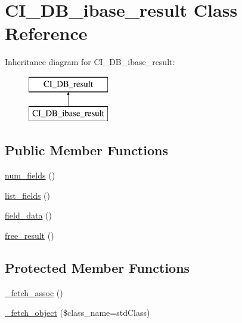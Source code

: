 \hypertarget{class_c_i___d_b__ibase__result}{}\section{C\+I\+\_\+\+D\+B\+\_\+ibase\+\_\+result Class Reference}
\label{class_c_i___d_b__ibase__result}
Inheritance diagram for C\+I\+\_\+\+D\+B\+\_\+ibase\+\_\+result\+:\begin{figure}[H]
\begin{center}
\leavevmode
\includegraphics[height=2.000000cm]{class_c_i___d_b__ibase__result}
\end{center}
\end{figure}
\subsection*{Public Member Functions}
\begin{DoxyCompactItemize}
\item 
\mbox{\hyperlink{class_c_i___d_b__ibase__result_a8d66562f20c26f68eb73cb5ba7a987b6}{num\+\_\+fields}} ()
\item 
\mbox{\hyperlink{class_c_i___d_b__ibase__result_ace2fc9e167af51df078023f9ff8bb62d}{list\+\_\+fields}} ()
\item 
\mbox{\hyperlink{class_c_i___d_b__ibase__result_a7c2cad1426d265028ce91925d4370a2c}{field\+\_\+data}} ()
\item 
\mbox{\hyperlink{class_c_i___d_b__ibase__result_ad26a10f8908e3a7fcd705905c9547ecf}{free\+\_\+result}} ()
\end{DoxyCompactItemize}
\subsection*{Protected Member Functions}
\begin{DoxyCompactItemize}
\item 
\mbox{\hyperlink{class_c_i___d_b__ibase__result_a7100d65f12a3a0e1916709138fc93c8c}{\+\_\+fetch\+\_\+assoc}} ()
\item 
\mbox{\hyperlink{class_c_i___d_b__ibase__result_a4cd29f44dfe18eb04d2388a74dfde2d4}{\+\_\+fetch\+\_\+object}} (\$class\+\_\+name=\textquotesingle{}std\+Class\textquotesingle{})
\end{DoxyCompactItemize}
